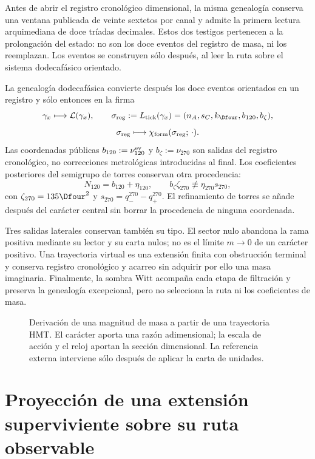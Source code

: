 Antes de abrir el registro cronológico dimensional, la misma genealogía conserva una
ventana publicada de veinte sextetos por canal y admite la primera lectura
arquimediana de doce tríadas decimales. Estos dos testigos pertenecen a la
prolongación del estado: no son los doce eventos del registro de masa, ni los
reemplazan. Los eventos se construyen sólo después, al leer la ruta sobre el
sistema dodecafásico orientado.

La genealogía dodecafásica convierte después los doce eventos orientados en un
registro y sólo entonces en la firma
\[
 \gamma_x\longmapsto\mathcal L(\gamma_x),\qquad
 \sigma_{\rm reg}:=L_{\rm tick}(\gamma_x)
 =(n_A,s_C,k_{\Dfour},b_{120},b_{\zeta}),
\]
\[
 \sigma_{\rm reg}\longmapsto
 \chi_{\rm form}(\sigma_{\rm reg};\,\cdot).
\]
Las coordenadas públicas \(b_{120}:=\nu_{120}^{\rm ev}\) y
\(b_{\zeta}:=\nu_{270}\) son salidas del registro cronológico, no correcciones
metrológicas introducidas al final. Los coeficientes posteriores del
semigrupo de torres conservan otra procedencia:
\[
 N_{120}=b_{120}+\eta_{120},\qquad
 b_{\zeta}\zeta_{270}\not\equiv\eta_{270}s_{270},
\]
con \(\zeta_{270}=135\Dfour^2\) y
\(s_{270}=q_-^{270}-q_+^{270}\). El refinamiento de torres se añade después
del carácter central sin borrar la procedencia de ninguna coordenada.

Tres salidas laterales conservan también su tipo. El sector nulo abandona la
rama positiva mediante su lector y su carta nulos; no es el límite
\(m\to0\) de un carácter positivo. Una trayectoria virtual es una extensión
finita con obstrucción terminal y conserva registro cronológico y acarreo sin adquirir por
ello una masa imaginaria. Finalmente, la sombra Witt acompaña cada etapa de filtración y
preserva la genealogía excepcional, pero no selecciona la ruta ni los
coeficientes de masa.

\begin{figure}[p]
\centering

\caption{Derivación de una magnitud de masa a partir de una trayectoria HMT.
El carácter aporta una razón adimensional; la escala de acción y el reloj
aportan la sección dimensional. La referencia externa interviene sólo después
de aplicar la carta de unidades.}
\label{fig:derivacion-masa-rev9}
\end{figure}

\section{Proyección de una extensión superviviente sobre su ruta observable}

